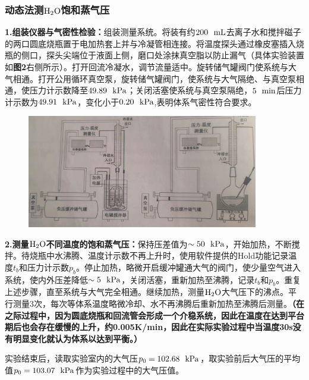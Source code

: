\documentclass[12pt]{article}
\begin{document}
		 \subsubsection{动态法测$\rm H_{2}O$饱和蒸气压}
		 \textbf{1.组装仪器与气密性检验：}组装测量系统。将装有约$200\ \ {\rm mL}$去离子水和搅拌磁子的两口圆底烧瓶置于电加热套上并与冷凝管相连接。将温度探头通过橡皮塞插入烧瓶的侧口，探头尖端位于液面上侧，磨口处涂抹真空脂以防止漏气（具体实验装置如\textbf{图2}右侧所示）。打开回流冷凝水，调节流量适中。旋转储气罐阀门使系统与大气相通。打开公用循环真空泵，旋转储气罐阀门，使系统与大气隔绝、与真空泵相通，使压力计示数降至$49.89\ \ {\rm kPa}$；关闭活塞使系统与真空泵隔绝，$5\ \ {\rm min}$后压力计示数为$49.91\ \ {\rm kPa}$，变化小于$0.20\ \ {\rm kPa}$,表明体系气密性符合要求。\par
			 \begin{figure}[h]
				\centering
				\includegraphics[width=0.9\textwidth]{2.png}
			\end{figure}
			\textbf{2.测量$\rm H_{2}O$不同温度的饱和蒸气压：}保持压差值为$\sim 50\ \ {\rm kPa}$，开始加热，不断搅拌。待烧瓶中水沸腾、温度计示数不再上升时，使用软件提供的Hold功能记录温度$t_{b}$和压力计示数$p_{b}$。停止加热，略微开启缓冲罐通大气的阀门，使少量空气进入系统，使内外压差降低$\sim 5\ \ {\rm kPa}$，关闭活塞，重新加热至沸腾，记录$t_{b}$和$p_{b}$。重复上述步骤，直至系统与大气完全相通。继续加热，测量$\rm H_{2}O$大气压下的沸点。平行测量3次，每次等体系温度略微冷却、水不再沸腾后重新加热至沸腾后测量。\textbf{（在之际过程中，因为圆底烧瓶和回流管会形成一个介稳系统，因此在温度在达到平台期后也会存在缓慢的上升，约0.005K/min，因此在实际实验过程中当温度30s没有明显变化就认为体系以达到平衡。）}\par 
			实验结束后，读取实验室内的大气压$p_{0}=102.68\ \ {\rm kPa}$，取实验前后大气压的平均值$p_{0}=103.07\ \ {\rm kPa}$作为实验过程中的大气压值。
\end{document}
